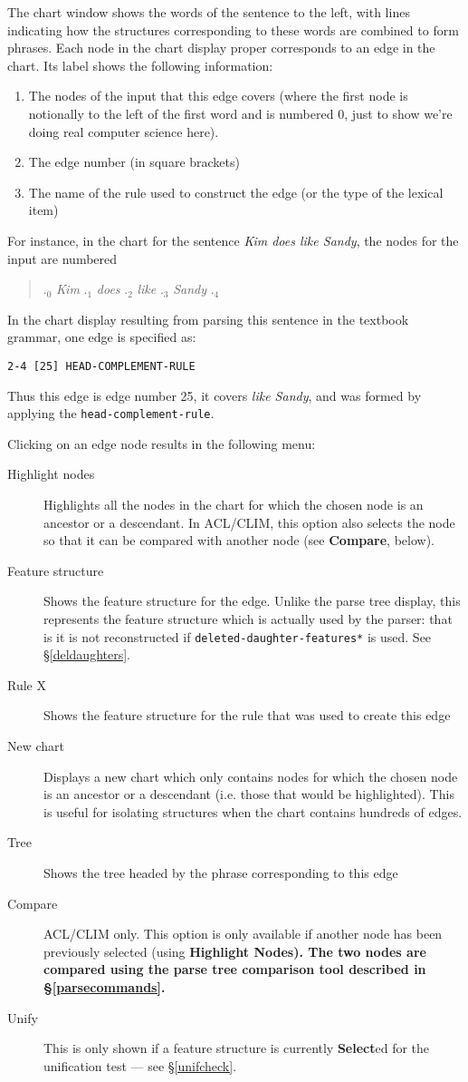 \documentclass[12pt]{report}
\newcommand{\lkbentryname}[1]{{\tt #1}}
\newcommand{\lkbparam}[1]{{\tt #1}}
\newcommand{\lkbmenucommand}{\bf}
\begin{document}
The chart window shows the words of the sentence to the left,
with lines indicating how the structures corresponding to these words
are combined to form phrases.  Each node in the chart display proper
corresponds to an edge in the chart.
Its label shows the following information:
\begin{enumerate}
\item The nodes of the input that this edge covers (where the first node
is notionally to the left of the first word and
is numbered 0, just to show we're doing real computer science here).
\item The edge number (in square brackets)
\item The name of the rule used to construct the edge
(or the type of the lexical item)
\end{enumerate}
For instance, in the chart for the sentence {\it Kim does like Sandy},
the nodes for the input are numbered
\begin{quote}
.$_{0}$ {\it Kim} .$_{1}$ {\it does} .$_{2}$ {\it like} 
.$_{3}$ {\it Sandy} .$_{4}$  
\end{quote}
In the chart display resulting from parsing this sentence 
in the textbook grammar, one edge is specified as:
\begin{verbatim}
2-4 [25] HEAD-COMPLEMENT-RULE
\end{verbatim}
Thus this edge is edge number 25, it covers {\it like Sandy}, 
and was formed by applying the \lkbentryname{head-complement-rule}.

Clicking on an edge node results in the following menu:
\begin{description}
\item[Highlight nodes] Highlights all the nodes
in the chart for which the chosen node is an ancestor or a descendant.
In ACL/CLIM, 
this option also selects the node so that it can be compared with another
node (see {\bf Compare}, below).
\item[Feature structure] Shows the feature structure for the
edge.  Unlike the parse tree display, this represents the feature structure
which is actually used by the parser: that is it is not reconstructed
if \lkbparam{*deleted-daughter-features*} is used.  See \S\ref{deldaughters}.
\item[Rule X]  Shows the feature structure for the rule that was used
to create this edge
\item[New chart] Displays a new chart which only contains nodes
for which the chosen node is an ancestor or a descendant (i.e. those that
would be highlighted).  This is useful for isolating structures
when the chart contains
hundreds of edges.
\item[Tree] Shows the tree headed by the phrase corresponding to
this edge
\item[Compare] ACL/CLIM only.  This option is only
available if another node has been previously 
selected (using \lkbmenucommand{Highlight 
Nodes}).  The two nodes are compared using the parse tree comparison
tool described in \S\ref{parsecommands}.
\item[Unify] This is only shown if a feature structure
is currently {\lkbmenucommand Select}ed for the unification test --- see 
\S\ref{unifcheck}.
\end{description}
\end{document}
